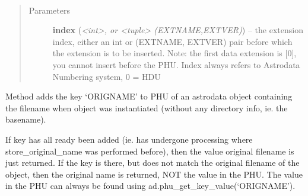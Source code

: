 \documentclass[letterpaper,10pt,english]{sphinxmanual}
\begin{document}
\begin{fulllineitems}

\begin{fulllineitems}
\label{astro_class:astrodata.AstroData.AstroData.remove}~\begin{quote}\begin{description}
\item[{Parameters}] \leavevmode
\textbf{index} (\emph{\textless{}int\textgreater{}, or \textless{}tuple\textgreater{} (EXTNAME,EXTVER)}) -- the extension index, either an int or (EXTNAME, EXTVER)
pair before which the extension is to be inserted.
Note: the first data extension is {[}0{]}, you cannot insert 
before the PHU. Index always refers to Astrodata Numbering 
system, 0 = HDU

\end{description}\end{quote}

\end{fulllineitems}


\begin{fulllineitems}
\label{astro_class:astrodata.AstroData.AstroData.store_original_name}
Method adds the key `ORIGNAME' to PHU of an astrodata object 
containing the filename when object was instantiated (without any 
directory info, ie. the basename).

If key has all ready been added (ie. has undergone processing where
store\_original\_name was performed before), then the value original 
filename is just returned.  If the key is there, but does not match
the original filename of the object, then the original name is 
returned, NOT the value in the PHU. The value in the PHU can always be
found using ad.phu\_get\_key\_value(`ORIGNAME').

\end{fulllineitems}



\end{fulllineitems}
\end{document}
